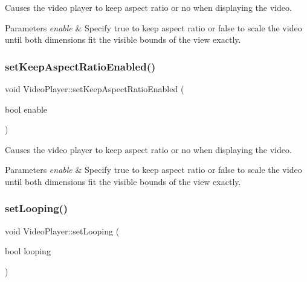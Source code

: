 Causes the video player to keep aspect ratio or no when displaying the video.


\begin{DoxyParams}{Parameters}
{\em enable} & Specify true to keep aspect ratio or false to scale the video until both dimensions fit the visible bounds of the view exactly. \\
\hline
\end{DoxyParams}
\mbox{\label{classexperimental_1_1ui_1_1VideoPlayer_a0421f619865f1ba5978e9cfbaf73e1e8}} 
\subsubsection{\texorpdfstring{set\+Keep\+Aspect\+Ratio\+Enabled()}{setKeepAspectRatioEnabled()}\hspace{0.1cm}{\footnotesize\ttfamily [2/2]}}
{\footnotesize\ttfamily void Video\+Player\+::set\+Keep\+Aspect\+Ratio\+Enabled (\begin{DoxyParamCaption}\item[{bool}]{enable }\end{DoxyParamCaption})\hspace{0.3cm}{\ttfamily [virtual]}}

Causes the video player to keep aspect ratio or no when displaying the video.


\begin{DoxyParams}{Parameters}
{\em enable} & Specify true to keep aspect ratio or false to scale the video until both dimensions fit the visible bounds of the view exactly. \\
\hline
\end{DoxyParams}
\mbox{\label{classexperimental_1_1ui_1_1VideoPlayer_ac9a14f276f28fed8fde5c29f79402f1f}} 
\subsubsection{\texorpdfstring{set\+Looping()}{setLooping()}}
{\footnotesize\ttfamily void Video\+Player\+::set\+Looping (\begin{DoxyParamCaption}\item[{bool}]{looping }\end{DoxyParamCaption})\hspace{0.3cm}{\ttfamily [virtual]}}



